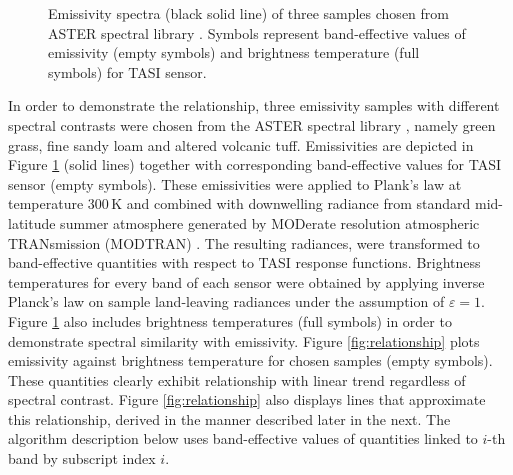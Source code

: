 \begin{figure}[!t]
\begin{subfigure}[t]{.3\linewidth}
		\caption{}
	\end{subfigure}
	\vspace{1.5 em}
	\caption{Emissivity spectra (black solid line) of three samples chosen from ASTER spectral library \cite{BH09}. Symbols represent band-effective values of emissivity (empty symbols) and brightness temperature (full symbols) for TASI sensor. }
	\label{fig:emissivitySpectra_spectra}
\end{figure}

In order to demonstrate the relationship, three emissivity samples with different spectral contrasts were chosen from the ASTER spectral library \cite{BH09}, namely green grass, fine sandy loam and altered volcanic tuff. Emissivities are depicted in Figure \ref{fig:emissivitySpectra_spectra} (solid lines) together with corresponding band-effective values for TASI sensor (empty symbols). These emissivities were applied to Plank's law at temperature $300\,\mathrm{K}$ and combined with downwelling radiance from standard mid-latitude summer atmosphere generated by MODerate resolution atmospheric TRANsmission (MODTRAN) \cite{BG06}. The resulting radiances, were transformed to band-effective quantities with respect to TASI response functions. Brightness temperatures for every band of each sensor were obtained by applying inverse Planck's law on sample land-leaving radiances under the assumption of $\varepsilon=1$. Figure \ref{fig:emissivitySpectra_spectra} also includes brightness temperatures (full symbols) in order to demonstrate spectral similarity with emissivity. Figure \ref{fig:relationship} plots emissivity against brightness temperature for chosen samples (empty symbols). These quantities clearly exhibit relationship with linear trend regardless of spectral contrast. Figure \ref{fig:relationship} also displays lines that approximate this relationship, derived in the manner described later in the next. The algorithm description below uses band-effective values of quantities linked to $i$-th band by subscript index $i$. 

